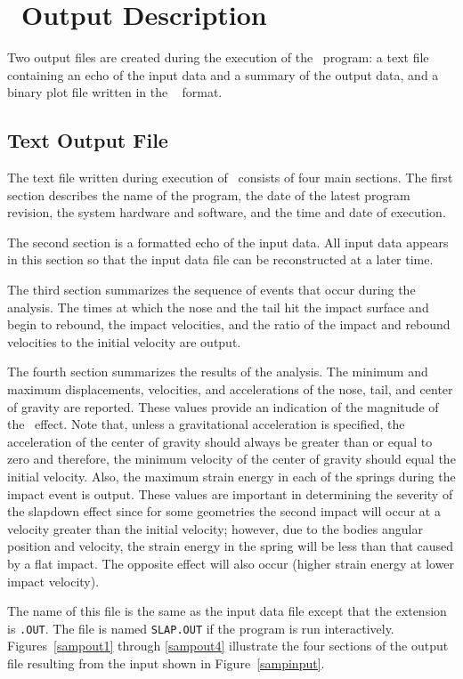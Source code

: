 \section{\SLAP\  Output Description}

Two output files are created during the execution of the \SLAP\ program:
a text file containing an echo of the input data and a summary of the
output data, and a binary plot file written in the \EXO~\cite{EXODUS}
format.

\subsection{Text Output File}

The text file written during execution of \SLAP\  consists
of four main sections.  The first section describes the name of the
program, the date of the latest program revision, the system hardware
and software, and the time and date of execution.

The second section is a formatted echo of the input data. All input data
appears in this section so that the input data file can be reconstructed
at a later time.

The third section summarizes the sequence of events that occur during
the analysis.  The times at which the nose and the tail hit the impact
surface and begin to rebound, the impact velocities, and the ratio
of the impact and rebound velocities to the initial velocity are output.

The fourth section summarizes the results of the analysis.  The minimum and
maximum displacements, velocities, and accelerations of the nose, tail, and
center of gravity are reported.  These values provide an indication of the
magnitude of the \SLAP\  effect.  Note that, unless a gravitational
acceleration is specified, the acceleration of the center of gravity should
always be greater than or equal to zero and therefore, the minimum velocity of
the center of gravity should equal the initial velocity.  Also, the maximum
strain energy in each of the springs during the impact event is output. These
values are important in determining the severity of the slapdown effect since
for some geometries the second impact will occur at a velocity greater than the
initial velocity; however, due to the bodies angular position and velocity, the
strain energy in the spring will be less than that caused by a flat impact.
The opposite effect will also occur (higher strain energy at lower impact
velocity).


The name of this file is the same as the input data file except that the
extension is {\tt .OUT}.   The file is named {\tt SLAP.OUT} if the program is
run interactively.  Figures~\ref{sampout1} through \ref{sampout4} illustrate
the four sections of the output file resulting from the input shown in
Figure~\ref{sampinput}.

